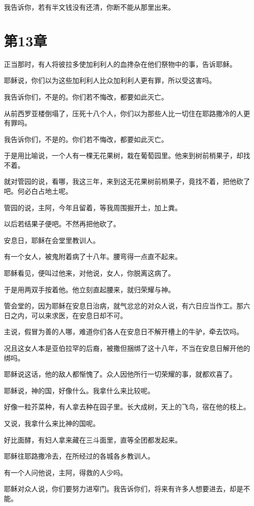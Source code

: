 \documentclass[12pt,oneside]{book}
\begin{document}
我告诉你，若有半文钱没有还清，你断不能从那里出来。

\chapter{第13章}
正当那时，有人将彼拉多使加利利人的血搀杂在他们祭物中的事，告诉耶稣。

耶稣说，你们以为这些加利利人比众加利利人更有罪，所以受这害吗。

我告诉你们，不是的。你们若不悔改，都要如此灭亡。

从前西罗亚楼倒塌了，压死十八个人，你们以为那些人比一切住在耶路撒冷的人更有罪吗。

我告诉你们，不是的。你们若不悔改，都要如此灭亡。

于是用比喻说，一个人有一棵无花果树，栽在葡萄园里。他来到树前梢果子，却找不着。

就对管园的说，看哪，我这三年，来到这无花果树前梢果子，竟找不着，把他砍了吧。何必白占地土呢。

管园的说，主阿，今年且留着，等我周围掘开土，加上粪。

以后若结果子便吧。不然再把他砍了。

安息日，耶稣在会堂里教训人。

有一个女人，被鬼附着病了十八年。腰弯得一点直不起来。

耶稣看见，便叫过他来，对他说，女人，你脱离这病了。

于是用两双手按着他。他立刻直起腰来，就归荣耀与神。

管会堂的，因为耶稣在安息日治病，就气忿忿的对众人说，有六日应当作工。那六日之内，可以来求医，在安息日却不可。

主说，假冒为善的人哪，难道你们各人在安息日不解开槽上的牛驴，牵去饮吗。

况且这女人本是亚伯拉罕的后裔，被撒但捆绑了这十八年，不当在安息日解开他的绑吗。

耶稣说这话，他的敌人都惭愧了。众人因他所行一切荣耀的事，就都欢喜了。

耶稣说，神的国，好像什么。我拿什么来比较呢。

好像一粒芥菜种，有人拿去种在园子里。长大成树，天上的飞鸟，宿在他的枝上。

又说，我拿什么来比神的国呢。

好比面酵，有妇人拿来藏在三斗面里，直等全团都发起来。

耶稣往耶路撒冷去，在所经过的各城各乡教训人。

有一个人问他说，主阿，得救的人少吗。

耶稣对众人说，你们要努力进窄门。我告诉你们，将来有许多人想要进去，却是不能。
\end{document}
